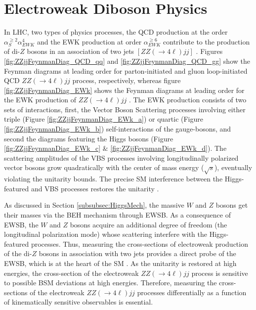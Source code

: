 \section{ Electroweak Diboson Physics } 
\label{sec:EWKPheno}

In LHC, two types of physics processes, the QCD production at the order $\alpha_{S}^{\geq 2} \alpha_{EWK}^{4}$ and the EWK production at order $\alpha_{EWK}^{\geq6}$ contribute to the production of di-$Z$ bosons in an association of two jets $[ ZZ( \rightarrow 4\ell) jj ]$ \cite{CMSRun2ZZjj}. Figures \ref{fig:ZZjjFeynmanDiag_QCD_qq} and \ref{fig:ZZjjFeynmanDiag_QCD_gg} show the Feynman diagrams at leading order for parton-initiated and gluon loop-initiated QCD $ZZ( \rightarrow 4\ell) jj$ process, respectively, whereas figure \ref{fig:ZZjjFeynmanDiag_EWk} shows the Feynman diagrams at leading order for the EWK production of $ZZ( \rightarrow 4\ell) jj$ \cite{PowhegV2ZZjj}. The EWK production consists of two sets of interactions, first, the Vector Boson Scattering processes involving either triple (Figure \ref{fig:ZZjjFeynmanDiag_EWk_a}) or quartic (Figure \ref{fig:ZZjjFeynmanDiag_EWk_b}) self-interactions of the gauge-bosons, and second the diagrams featuring the Higgs bosons (Figure \ref{fig:ZZjjFeynmanDiag_EWk_c} $\&$ \ref{fig:ZZjjFeynmanDiag_EWk_d}). The scattering amplitudes of the VBS processes involving longitudinally polarized vector bosons grow quadratically with the center of mass energy ($\sqrt{s}$), eventually violating the unitarity bounds. The precise SM interference between the Higgs-featured and VBS processes restores the unitarity \cite{VBSWWWW}.

As discussed in Section \ref{subsubsec:HiggsMech}, the massive $W$ and $Z$ bosons get their masses via the BEH mechanism through EWSB. As a consequence of EWSB, the $W$ and $Z$ bosons acquire an additional degree of freedom (the longitudinal polarization mode) whose scattering interfere with the Higgs-featured processes. Thus, measuring the cross-sections of electroweak production of the di-$Z$ bosons in association with two jets provides a direct probe of the EWSB, which is at the heart of the SM \cite{CMSRun2ZZjj}. As the unitarity is restored at high energies, the cross-section of the electroweak $ZZ( \rightarrow 4\ell) jj$ process is sensitive to possible BSM deviations at high energies. Therefore, measuring the cross-sections of the electroweak $ZZ( \rightarrow 4\ell) jj$ processes differentially as a function of kinematically sensitive observables is essential. 

